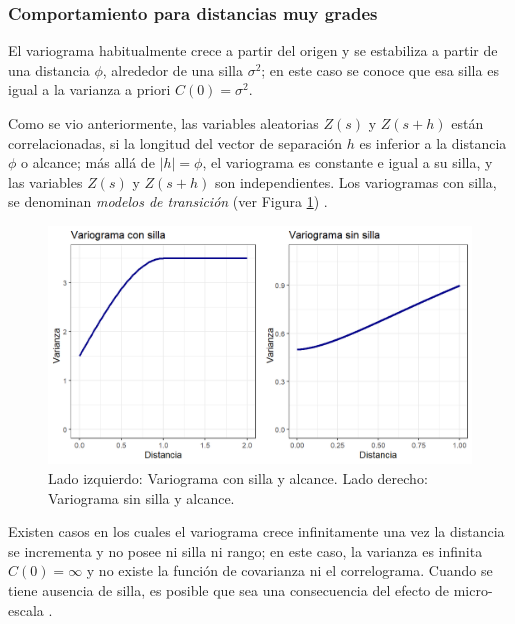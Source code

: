 \documentclass[
]{book}
\begin{document}
\hypertarget{comportamiento-para-distancias-muy-grades}{%
\subsubsection*{Comportamiento para distancias muy grades}\label{comportamiento-para-distancias-muy-grades}}

El variograma habitualmente crece a partir del origen y se estabiliza a partir de una distancia \(\phi\), alrededor de una silla \(\sigma^2\); en este caso se conoce que esa silla es igual a la varianza a priori \(C(0)=\sigma^2\).

Como se vio anteriormente, las variables aleatorias \(Z(s)\) y \(Z(s+h)\) están correlacionadas, si la longitud del vector de separación \(h\) es inferior a la distancia \(\phi\) o alcance; más allá de \(|h|=\phi\), el variograma es constante e igual a su silla, y las variables \(Z(s)\) y \(Z(s+h)\) son independientes. Los variogramas con silla, se denominan \textit{modelos de transición} (ver Figura \ref{fig:varsill}) \citep{emery}.

\begin{figure}
\includegraphics[width=17.78in]{figuras/otros/vari_sill} \caption{Lado izquierdo: Variograma con silla y alcance. Lado derecho: Variograma sin silla y  alcance.}\label{fig:varsill}
\end{figure}

Existen casos en los cuales el variograma crece infinitamente una vez la distancia se incrementa y no posee ni silla ni rango; en este caso, la varianza es infinita \(C(0)=\infty\) y no existe la función de covarianza ni el correlograma. Cuando se tiene ausencia de silla, es posible que sea una consecuencia del efecto de micro-escala \citep{emery}.
\end{document}
